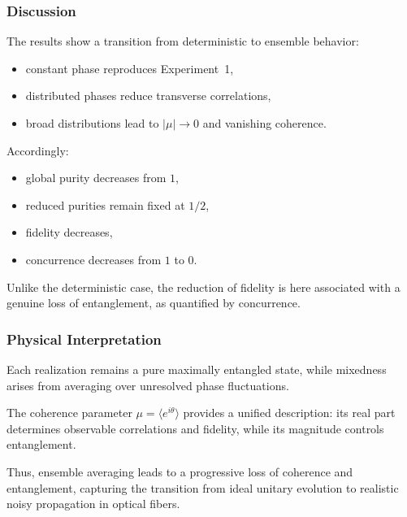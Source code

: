 \documentclass[a4paper]{article}
\begin{document}
\subsubsection{Discussion}

The results show a transition from deterministic to ensemble behavior:
\begin{itemize}
\item constant phase reproduces Experiment~1,
\item distributed phases reduce transverse correlations,
\item broad distributions lead to \( |\mu| \to 0 \) and vanishing coherence.
\end{itemize}

Accordingly:
\begin{itemize}
\item global purity decreases from \(1\),
\item reduced purities remain fixed at \(1/2\),
\item fidelity decreases,
\item concurrence decreases from \(1\) to \(0\).
\end{itemize}

Unlike the deterministic case, the reduction of fidelity is here associated with a genuine loss of entanglement, as quantified by concurrence.


\subsubsection{Physical Interpretation}

Each realization remains a pure maximally entangled state, while mixedness arises from averaging over unresolved phase fluctuations.

The coherence parameter \( \mu = \langle e^{i\theta} \rangle \) provides a unified description: its real part determines observable correlations and fidelity, while its magnitude controls entanglement.

Thus, ensemble averaging leads to a progressive loss of coherence and entanglement, capturing the transition from ideal unitary evolution to realistic noisy propagation in optical fibers.


\end{document}
